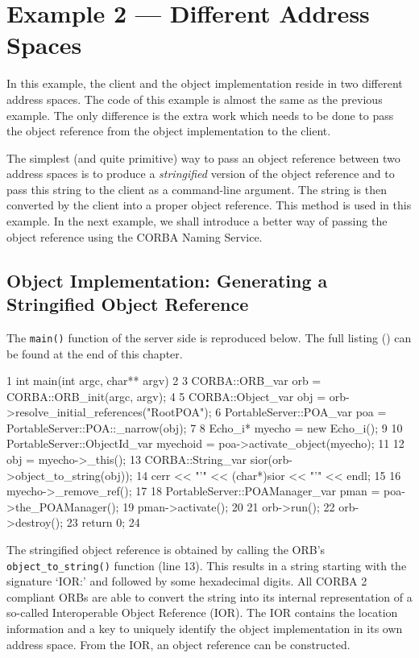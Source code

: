 \documentclass[11pt,twoside,a4paper]{book}
\newcommand{\op}[1]{\texttt{#1()}}
\newcommand{\term}[1]{\textit{#1}}
\newcommand{\file}{\begingroup \urlstyle{tt}\Url}
\newcommand{\dsc}{\discretionary{}{}{}}
\begin{document}
\section{Example 2 --- Different Address Spaces}

In this example, the client and the object implementation reside in
two different address spaces. The code of this example is almost the
same as the previous example. The only difference is the extra work
which needs to be done to pass the object reference from the object
implementation to the client.

The simplest (and quite primitive) way to pass an object reference
between two address spaces is to produce a \term{stringified} version
of the object reference and to pass this string to the client as a
command-line argument.  The string is then converted by the client
into a proper object reference.  This method is used in this
example. In the next example, we shall introduce a better way of
passing the object reference using the CORBA Naming Service.

\subsection{Object Implementation: Generating a Stringified Object Reference}

The \op{main} function of the server side is reproduced below. The
full listing (\file{eg2_impl.cc}) can be found at the end of this
chapter.

\lstset{labelstep=1,gobble=4}
\begin{cxxlisting}
 1  int main(int argc, char** argv)
 2  {
 3    CORBA::ORB_var orb = CORBA::ORB_init(argc, argv);
 4
 5    CORBA::Object_var       obj = orb->resolve_initial_references("RootPOA");
 6    PortableServer::POA_var poa = PortableServer::POA::_narrow(obj);
 7
 8    Echo_i* myecho = new Echo_i();
 9
10    PortableServer::ObjectId_var myechoid = poa->activate_object(myecho);
11
12    obj = myecho->_this();
13    CORBA::String_var sior(orb->object_to_string(obj));
14    cerr << "'" << (char*)sior << "'" << endl;
15
16    myecho->_remove_ref();
17
18    PortableServer::POAManager_var pman = poa->the_POAManager();
19    pman->activate();
20
21    orb->run();
22    orb->destroy();
23    return 0;
24  }
\end{cxxlisting}
\lstset{labelstep=0,gobble=0}

The stringified object reference is obtained by calling the ORB's
\op{object\_to\_\dsc{}string} function (line 13). This results in a
string starting with the signature `IOR:' and followed by some
hexadecimal digits. All CORBA 2 compliant ORBs are able to convert the
string into its internal representation of a so-called Interoperable
Object Reference (IOR). The IOR contains the location information and
a key to uniquely identify the object implementation in its own
address space. From the IOR, an object reference can be constructed.
\end{document}
